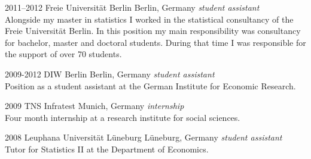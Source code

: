 \documentclass[]{friggeri-cv} %
\begin{document}
\begin{entrylist}

\entry
{2011--2012}
{Freie Universit\"at Berlin}
{Berlin, Germany}
{\emph{student assistant} \\
Alongside my master in statistics I worked in the statistical consultancy of the Freie Universit\"at Berlin. In this position my main responsibility was consultancy for bachelor, master and doctoral students. During that time I was responsible for the support of over 70 students.}


\entry
{2009-2012}
{DIW Berlin}
{Berlin, Germany}
{\emph{student assistant} \\
Position as a student assistant at the German Institute for Economic Research.}


\entry
{2009}
{TNS Infratest}
{Munich, Germany}
{\emph{internship} \\
Four month internship at a research institute for social sciences.}


\entry
{2008}
{Leuphana Universit\"at L\"uneburg}
{L\"uneburg, Germany}
{\emph{student assistant} \\
Tutor for Statistics II at the Department of Economics.}


\end{entrylist}



%
%
%

\end{document}
